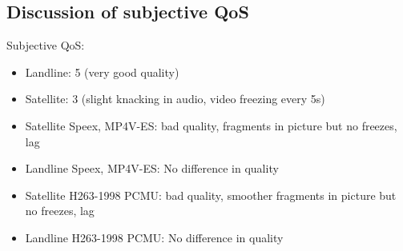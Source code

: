 \documentclass[parskip=full]{scrartcl}
\begin{document}
\subsection{Discussion of subjective QoS}
Subjective QoS:
\begin{itemize}
	\item Landline: 5 (very good quality)
	\item Satellite: 3 (slight knacking in audio, video freezing every 5s)
	\item Satellite Speex, MP4V-ES: bad quality, fragments in picture but no freezes, lag
	\item Landline Speex, MP4V-ES: No difference in quality
	\item Satellite H263-1998 PCMU: bad quality, smoother fragments in picture but no freezes, lag
	\item Landline H263-1998 PCMU: No difference in quality
\end{itemize}





\end{document}
